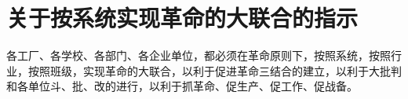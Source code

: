 \section[关于按系统实现革命的大联合的指示（一九六七年十月十七日）]{关于按系统实现革命的大联合的指示}


各工厂、各学校、各部门、各企业单位，都必须在革命原则下，按照系统，按照行业，按照班级，实现革命的大联合，以利于促进革命三结合的建立，以利于大批判和各单位斗、批、改的进行，以利于抓革命、促生产、促工作、促战备。




